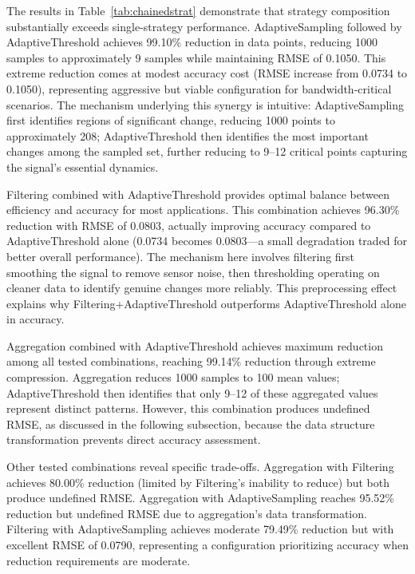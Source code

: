 \documentclass[10pt,twocolumn]{article}
\begin{document}
The results in Table~\ref{tab:chainedstrat} demonstrate that strategy composition substantially exceeds single-strategy performance. AdaptiveSampling followed by AdaptiveThreshold achieves 99.10\% reduction in data points, reducing 1000 samples to approximately 9 samples while maintaining RMSE of 0.1050. This extreme reduction comes at modest accuracy cost (RMSE increase from 0.0734 to 0.1050), representing aggressive but viable configuration for bandwidth-critical scenarios. The mechanism underlying this synergy is intuitive: AdaptiveSampling first identifies regions of significant change, reducing 1000 points to approximately 208; AdaptiveThreshold then identifies the most important changes among the sampled set, further reducing to 9--12 critical points capturing the signal's essential dynamics.

Filtering combined with AdaptiveThreshold provides optimal balance between efficiency and accuracy for most applications. This combination achieves 96.30\% reduction with RMSE of 0.0803, actually improving accuracy compared to AdaptiveThreshold alone (0.0734 becomes 0.0803---a small degradation traded for better overall performance). The mechanism here involves filtering first smoothing the signal to remove sensor noise, then thresholding operating on cleaner data to identify genuine changes more reliably. This preprocessing effect explains why Filtering+AdaptiveThreshold outperforms AdaptiveThreshold alone in accuracy.

Aggregation combined with AdaptiveThreshold achieves maximum reduction among all tested combinations, reaching 99.14\% reduction through extreme compression. Aggregation reduces 1000 samples to 100 mean values; AdaptiveThreshold then identifies that only 9--12 of these aggregated values represent distinct patterns. However, this combination produces undefined RMSE, as discussed in the following subsection, because the data structure transformation prevents direct accuracy assessment.

Other tested combinations reveal specific trade-offs. Aggregation with Filtering achieves 80.00\% reduction (limited by Filtering's inability to reduce) but both produce undefined RMSE. Aggregation with AdaptiveSampling reaches 95.52\% reduction but undefined RMSE due to aggregation's data transformation. Filtering with AdaptiveSampling achieves moderate 79.49\% reduction but with excellent RMSE of 0.0790, representing a configuration prioritizing accuracy when reduction requirements are moderate.
\end{document}
